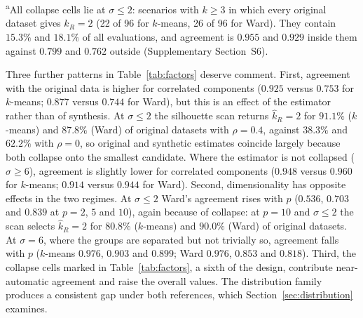 \documentclass[pdflatex,referee]{sn-jnl}
\begin{document}
\begin{table}[!tbp]
\centering
\caption{Agreement in the number of groups by design factor, over the full
         720{,}000-evaluation design, under the two references of
         Eq.~\eqref{eq:sr}: the planted number of groups ($\mathrm{RR}$) and
         the number estimated from the original data ($\mathrm{AG}$). Each
         entry is a marginal mean over all other factors; candidate range
         $\{2,\dots,8\}$. Wilcoxon $p$: paired signed-rank test of $k$-means
         against Ward across the 144 scenario-level means. The capped range
         $\{2,\dots,\min(k+3,8)\}$ is reported in Supplementary Table~S2.}
\label{tab:factors}
\small

\par\smallskip
\begin{minipage}{0.92\linewidth}\footnotesize
\textsuperscript{a}All collapse cells lie at $\sigma \le 2$: scenarios with
$k \ge 3$ in which every original dataset gives $\hat{k}_R = 2$ (22 of 96 for
$k$-means, 26 of 96 for Ward). They contain $15.3\%$ and $18.1\%$ of all
evaluations, and agreement is $0.955$ and $0.929$ inside them against $0.799$
and $0.762$ outside (Supplementary Section~S6).
\end{minipage}
\end{table}

Three further patterns in Table~\ref{tab:factors} deserve comment. First,
agreement with the original data is higher for correlated components
($0.925$ versus $0.753$ for $k$-means; $0.877$ versus $0.744$ for Ward), but
this is an effect of the estimator rather than of synthesis. At
$\sigma \le 2$ the silhouette scan returns $\hat{k}_R = 2$ for $91.1\%$
($k$-means) and $87.8\%$ (Ward) of original datasets with $\rho = 0.4$,
against $38.3\%$ and $62.2\%$ with $\rho = 0$, so original and synthetic
estimates coincide largely because both collapse onto the smallest candidate.
Where the estimator is not collapsed ($\sigma \ge 6$), agreement is slightly
lower for correlated components ($0.948$ versus $0.960$ for $k$-means;
$0.914$ versus $0.944$ for Ward). Second, dimensionality has opposite effects
in the two regimes. At $\sigma \le 2$ Ward's agreement rises with $p$ ($0.536$,
$0.703$ and $0.839$ at $p = 2$, $5$ and $10$), again because of collapse: at
$p = 10$ and $\sigma \le 2$ the scan selects $\hat{k}_R = 2$ for $80.8\%$
($k$-means) and $90.0\%$ (Ward) of original datasets. At $\sigma = 6$, where
the groups are separated but not trivially so, agreement falls with $p$
($k$-means $0.976$, $0.903$ and $0.899$; Ward $0.976$, $0.853$ and $0.818$).
Third, the collapse cells marked in Table~\ref{tab:factors}, a sixth of the
design, contribute near-automatic agreement and raise the overall values. The
distribution family produces a consistent gap under both references, which
Section~\ref{sec:distribution} examines.
\end{document}
